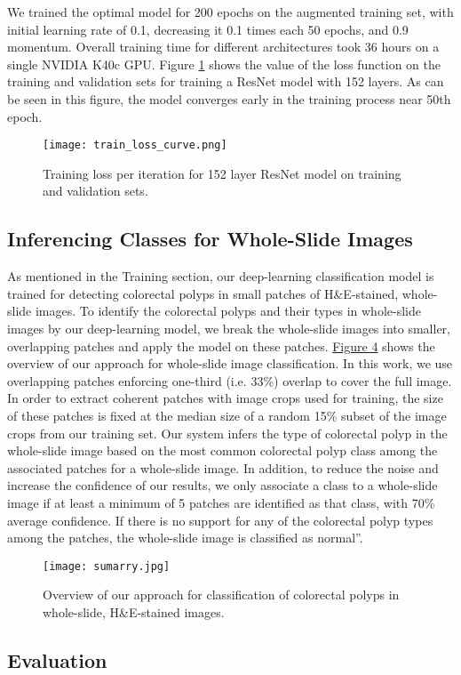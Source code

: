 \documentclass[review]{elsarticle}
\begin{document}
We trained the optimal model for 200 epochs on the augmented training set, with initial learning rate of 0.1, decreasing it 0.1 times each 50 epochs, and 0.9 momentum. Overall training time for different architectures took 36 hours on a single NVIDIA K40c GPU. Figure \ref{fig:loss} shows the value of the loss function on the training and validation sets for training a ResNet model with 152 layers. As can be seen in this figure, the model converges early in the training process near 50th epoch.

\begin{figure}[ht!]
\centering
\texttt{[image: train\_loss\_curve.png]}
\caption{Training loss per iteration for 152 layer ResNet model on training and validation sets.}
\label{fig:loss}
\end{figure}\subsection{Inferencing Classes for Whole-Slide Images}\label{inference}
As mentioned in the Training section, our deep-learning classification model is trained for detecting colorectal polyps in small patches of H\&E-stained, whole-slide images. To identify the colorectal polyps and their types in whole-slide images by our deep-learning model, we break the whole-slide images into smaller, overlapping patches and apply the model on these patches. \hyperref[fig:overview]{Figure 4} shows the overview of our approach for whole-slide image classification. In this work, we use overlapping patches enforcing one-third (i.e. 33\%) overlap to cover the full image. In order to extract coherent patches with image crops used for training, the size of these patches is fixed at the median size of a random 15\% subset of the image crops from our training set. Our system infers the type of colorectal polyp in the whole-slide image based on the most common colorectal polyp class among the associated patches for a whole-slide image. In addition, to reduce the noise and increase the confidence of our results, we only associate a class to a whole-slide image if at least a minimum of 5 patches are identified as that class, with 70\% average confidence. If there is no support for any of the colorectal polyp types among the patches, the whole-slide image is classified as normal”.
\vspace*{0.5cm}\begin{figure}[h!]
\centering
\texttt{[image: sumarry.jpg]}
\caption{Overview of our approach for classification of colorectal polyps in whole-slide, H\&E-stained images.}
\label{fig:overview}
\end{figure}\subsection{Evaluation}\label{evaluation}
\end{document}
